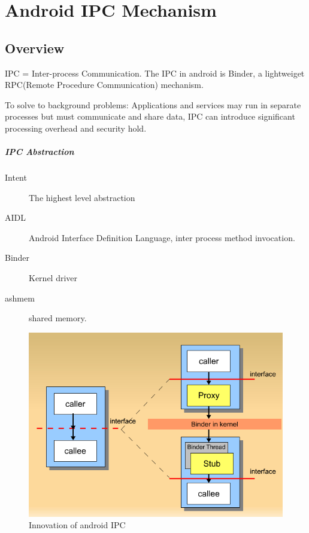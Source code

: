 \documentclass[11pt, a4paper]{book}
\begin{document}
\chapter{Android IPC Mechanism}
\section{Overview}
IPC = Inter-process Communication. The IPC in android is Binder, a lightweiget
RPC(Remote Procedure Communication) mechanism.

To solve to background problems: Applications and services may run in separate
processes but must communicate and share data, IPC can introduce significant
processing overhead and security hold.

\paragraph{IPC Abstraction}
\begin{description}
    \item [Intent] The highest level abstraction
    \item [AIDL] Android Interface Definition Language, inter process method
        invocation.
    \item [Binder] Kernel driver
    \item [ashmem] shared memory.
\end{description}
\begin{figure}
    \centering
    \includegraphics[scale=0.5]{IPC_invo.png}
    \caption{Innovation of android IPC}
\end{figure}
\end{document}
